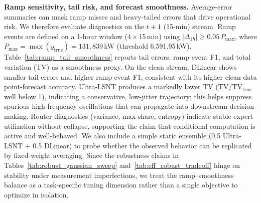 \documentclass[review,3p,times]{elsarticle}
\begin{document}
\noindent\textbf{Ramp sensitivity, tail risk, and forecast smoothness.}
Average-error summaries can mask ramp misses and heavy-tailed errors that drive operational risk. We therefore evaluate diagnostics on the $t+1$ (15-min) stream. Ramp events are defined on a 1-hour window ($4\times$15\,min) using $|\Delta_{1h}|\ge 0.05\,P_{\max}$, where $P_{\max}=\max(y_{\text{true}})=131{,}839$\,kW (threshold 6{,}591.95\,kW). Table~\ref{tab:ramp_tail_smoothness} reports tail errors, ramp-event F1, and total variation (TV) as a smoothness proxy. On the clean stream, DLinear shows smaller tail errors and higher ramp-event F1, consistent with its higher clean-data point-forecast accuracy. Ultra-LSNT produces a markedly lower TV (TV/TV$_{\text{true}}$ well below 1), indicating a conservative, low-jitter trajectory; this helps suppress spurious high-frequency oscillations that can propagate into downstream decision-making. Router diagnostics (variance, max-share, entropy) indicate stable expert utilization without collapse, supporting the claim that conditional computation is active and well-behaved. We also include a simple static ensemble (0.5 Ultra-LSNT + 0.5 DLinear) to probe whether the observed behavior can be replicated by fixed-weight averaging. Since the robustness claims in Tables~\ref{tab:robust_gaussian_sweep} and~\ref{tab:eff_robust_tradeoff} hinge on stability under measurement imperfections, we treat the ramp--smoothness balance as a task-specific tuning dimension rather than a single objective to optimize in isolation.

\begin{table}[t]
\centering
\caption{Ramp/tail/smoothness diagnostics on Wind (CN) using the 15-min $t+1$ forecast stream. Ramp events are defined by $|\Delta_{1h}|\ge 0.05\,P_{\max}$ with $P_{\max}=131{,}839$\,kW (threshold 6{,}591.95\,kW). TV is $\sum_t | \hat{y}_t-\hat{y}_{t-1} |$; TV/TV$_{\text{true}}$ normalizes by the realized series. Routing stability is reported for Ultra-LSNT via the mean router-usage variance (lower is more stable), together with the mean max-share and normalized entropy of routing weights. For non-MoE baselines, we report fixed-path equivalents to avoid empty cells.}
\label{tab:ramp_tail_smoothness}
\begingroup
\setlength{\tabcolsep}{3.5pt}
\small
{}
\endgroup
\end{table}
\end{document}
